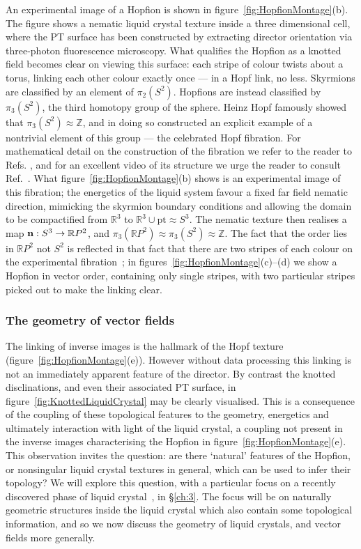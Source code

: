 An experimental image of a Hopfion is shown in figure~\ref{fig:HopfionMontage}(b)\citep{ChenThesis,Chen2013}. The figure shows a nematic liquid crystal texture inside a three dimensional cell, where the PT surface has been constructed by extracting director orientation via three-photon fluorescence microscopy. What qualifies the Hopfion as a knotted field becomes clear on viewing this surface: each stripe of colour twists about a torus, linking each other colour exactly once --- in a Hopf link, no less. Skyrmions are classified by an element of $\pi_2(S^2)$. Hopfions are instead classified by $\pi_3(S^2)$, the third homotopy group of the sphere. Heinz Hopf famously showed that $\pi_3(S^2) \approx \mathbb{Z}$, and in doing so constructed an explicit example of a nontrivial element of this group --- the celebrated Hopf fibration. For mathematical detail on the construction of the fibration we refer to the reader to Refs. \citep{BottTuBook,AlexanderBook}, and for an excellent video of its structure we urge the reader to consult Ref.~\citep{Johnson2011}. What figure~\ref{fig:HopfionMontage}(b) shows is an experimental image of this fibration; the energetics of the liquid system favour a fixed far field nematic direction, mimicking the skyrmion boundary conditions and allowing the domain to be compactified  from $\mathbb{R}^3$ to $\mathbb{R}^3 \cup \textrm{pt} \approx {S}^3$. The nematic texture then realises a map ${\bf n}: S^3 \rightarrow \mathbb{R}P^2$, and $\pi_3(\mathbb{R}P^2) \approx \pi_3(S^2) \approx \mathbb{Z}$. The fact that the order lies in $\mathbb{R}P^2$ not $S^2$ is reflected in that fact that there are two stripes of each colour on the experimental fibration~\citep{Chen2013,Ackerman2017}; in figures~\ref{fig:HopfionMontage}(c)--(d) we show a Hopfion in vector order, containing only single stripes, with two particular stripes picked out to make the linking clear.
\subsubsection{The geometry of vector fields}
\label{subsec:Geometry}
The linking of inverse images is the hallmark of the Hopf texture (figure~\ref{fig:HopfionMontage}(e)). However without data processing this linking is not an immediately apparent feature of the director. By contrast the knotted disclinations, and even their associated PT surface, in figure~\ref{fig:KnottedLiquidCrystal} may be clearly visualised. This is a consequence of the coupling of these topological features to the geometry, energetics and ultimately interaction with light of the liquid crystal, a coupling not present in the inverse images characterising the Hopfion in figure~\ref{fig:HopfionMontage}(e). This observation invites the question: are there `natural' features of the Hopfion, or nonsingular liquid crystal textures in general, which can be used to infer their topology? We will explore this question, with a particular focus on a recently discovered phase of liquid crystal~\citep{Lavrentovich2018}, in \S\ref{ch:3}. The focus will be on naturally geometric structures inside the liquid crystal which also contain some topological information, and so we now discuss the geometry of liquid crystals, and vector fields more generally. 

